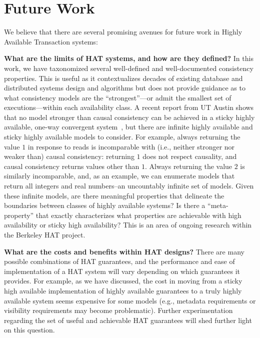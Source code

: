 
\section{Future Work}
\label{sec:futurework}

We believe that there are several promising avenues for future work in
Highly Available Transaction systems:

\textbf{What are the limits of HAT systems, and how are they defined?}
In this work, we have taxonomized several well-defined and
well-documented consistency properties. This is useful as it
contextualizes decades of existing database and distributed systems
design and algorithms but does not provide guidance as to what
consistency models are the ``strongest''---or admit the smallest set
of executions---within each availability class. A recent report from
UT Austin shows that no model stronger than causal consistency can be
achieved in a sticky highly available, one-way convergent
system~\cite{cac}, but there are infinite highly available and sticky
highly available models to consider. For example, always returning the
value $1$ in response to reads is incomparable with (i.e., neither
stronger nor weaker than) causal consistency: returning $1$ does not
respect causality, and causal consistency returns values other than
$1$. Always returning the value $2$ is similarly incomparable, and, as
an example, we can enumerate models that return all integers and real
numbers--an uncountably infinite set of models. Given these infinite
models, are there meaningful properties that delineate the boundaries
between classes of highly available systems? Is there a
``meta-property'' that exactly characterizes what properties are
achievable with high availability or sticky high availability? This is
an area of ongoing research within the Berkeley HAT project.

\textbf{What are the costs and benefits within HAT designs?} There are
many possible combinations of HAT guarantees, and the performance and
ease of implementation of a HAT system will vary depending on which
guarantees it provides. For example, as we have discussed, the cost in
moving from a sticky high available implementation of highly available
guarantees to a truly highly available system seems expensive for some
models (e.g., metadata requirements or visibility requirements may
become problematic). Further experimentation regarding the set of
useful and achievable HAT guarantees will shed further light on this
question.

